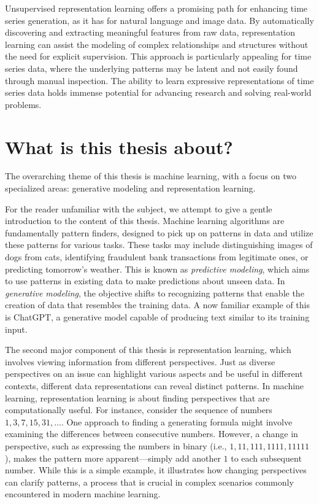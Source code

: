 \documentclass[../../thesis.tex]{subfiles}
\begin{document}
Unsupervised representation learning offers a promising path for enhancing time series generation, as it has for natural language and image data. By automatically discovering and extracting meaningful features from raw data, representation learning can assist the modeling of complex relationships and structures without the need for explicit supervision. This approach is particularly appealing for time series data, where the underlying patterns may be latent and not easily found through manual inspection. The ability to learn expressive representations of time series data holds immense potential for advancing research and solving real-world problems.

\section{What is this thesis about?}

The overarching theme of this thesis is machine learning, with a focus on two specialized areas: generative modeling and representation learning.\newline

For the reader unfamiliar with the subject, we attempt to give a gentle introduction to the content of this thesis. Machine learning algorithms are fundamentally pattern finders, designed to pick up on patterns in data and utilize these patterns for various tasks. These tasks may include distinguishing images of dogs from cats, identifying fraudulent bank transactions from legitimate ones, or predicting tomorrow's weather. This is known as \textit{predictive modeling}, which aims to use patterns in existing data to make predictions about unseen data. In \textit{generative modeling}, the objective shifts to recognizing patterns that enable the creation of data that resembles the training data. A now familiar example of this is ChatGPT, a generative model capable of producing text similar to its training input.\newline

The second major component of this thesis is representation learning, which involves viewing information from different perspectives. Just as diverse perspectives on an issue can highlight various aspects and be useful in different contexts, different data representations can reveal distinct patterns. In machine learning, representation learning is about finding perspectives that are computationally useful. For instance, consider the sequence of numbers $1, 3, 7, 15, 31, \dots$. One approach to finding a generating formula might involve examining the differences between consecutive numbers. However, a change in perspective, such as expressing the numbers in binary (i.e., $1, 11, 111, 1111, 11111$), makes the pattern more apparent—simply add another $1$ to each subsequent number. While this is a simple example, it illustrates how changing perspectives can clarify patterns, a process that is crucial in complex scenarios commonly encountered in modern machine learning.\newline
\end{document}
